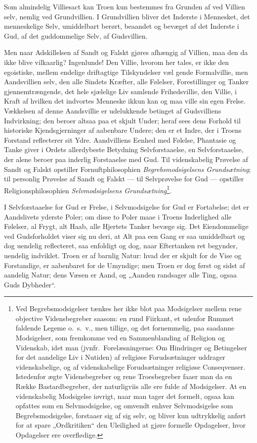 \documentclass[12pt]{book}
\begin{document}
Som almindelig Villiesact kan Troen kun bestemmes fra Grunden af ved
Villien selv, nemlig ved Grundvillien. I Grundvillien bliver det
Inderste i Mennesket, det menneskelige Selv, umiddelbart berørt,
beaandet og bevæget af det Inderste i Gud, af det guddommelige Selv,
af Gudsvillien.

Men naar Adskillelsen af Sandt og Falskt gjøres afhængig af Villien,
maa den da ikke blive vilkaarlig? Ingenlunde! Den Villie, hvorom her
tales, er ikke den egoistiske, mellem endelige driftagtige
Tilskyndelser væl\-
gende Formalvillie, men Aandsvillien selv, den alle Sindets
Kræfter, alle Følelser, Forestillinger og Tanker gjennemtrængende,
det hele sjælelige Liv samlende Frihedsvillie, den Villie, i Kraft
af hvilken det indvortes Menneske ikkun kan og maa ville sin egen
Frelse. Vækkelsen af denne Aandsvillie er udelukkende betinget af
Gudsvilliens Indvirkning; den beroer altsaa paa et skjult Under;
heraf sees dens Forhold til historiske Kjendsgjerninger af aabenbare
Undere; den er et Indre, der i Troens Forstand reflecterer sit
Ydre. Aandvilliens Eenhed med Følelse, Phantasie og Tanke giver i
Ordets allerdybeste Betydning Selvforstaaelse, en Selvforstaaelse,
der alene beroer paa inderlig Forstaaelse med Gud. Til videnskabelig
Prøvelse af Sandt og Falskt opstiller Fornuftphilosophien
\emph{Begrebsmodsigelsens Grundsætning}; til personlig Prøvelse af
Sandt og Falskt --- til Selvprøvelse for Gud --- opstiller
Religionsphilosophien \emph{Selvmodsigelsens
Grundsætning}\footnote{Ved Begrebsmodsigelser tænkes her ikke blot
paa Modsigelser mellem rene objective Vidensbegreber saasom: en rund
Fiirkant, et udenfor Rummet faldende Legeme o.\ s.\ v., men tillige,
og det fornemmelig, paa saadanne Modsigelser, som fremkomme ved en
Sammenblanding af Religion og Videnskab, idet man (jvnfr.\
Forelæsningerne: Om Hindringer og Betingelser for det aandelige Liv
i Nutiden) af religiøse Forudsætninger uddrager videnskabelige, og
af videnskabelige Forudsætninger religiøse Conseqvenser. Istedenfor
ægte Vidensbegreber og rene Troesbegreber faaer man da en Række
Bastardbegreber, der naturligviis alle ere fulde af Modsigelser. At
en videnskabelig Modsigelse iøvrigt, naar man tager det formelt,
ogsaa kan opfattes som en Selvmodsigelse, og omvendt enhver
Selvmodsigelse som Begrebsmodsigelse, forstaaer sig af sig selv, og
bliver kun udtrykkelig anført for at spare „Ordkritiken“ den
Uleilighed at gjøre formelle Opdagelser, hvor Opdagelser ere
overflødige.}.

I Selvforstaaelse for Gud er Frelse, i Selvmodsigelse for Gud er
Fortabelse; det er Aandslivets yderste Poler; om disse to Poler maae
i Troens Inderlighed alle Følelser,
al Frygt, alt Haab, alle Hjertets Tanker bevæge sig. Det
Eiendommelige ved Gudsforholdet viser sig nu deri, at Alt paa een
Gang er saa umiddelbart og dog uendelig reflecteret, saa enfoldigt
og dog, naar Eftertanken ret begynder, uendelig indviklet. Troen er
af barnlig Natur: hvad der er skjult for de Vise og Forstandige, er
aabenbaret for de Umyndige; men Troen er dog først og sidst af
aandelig Natur; dens Væsen er Aand, og „Aanden randsager alle Ting,
ogsaa Guds Dybheder“.
\end{document}

